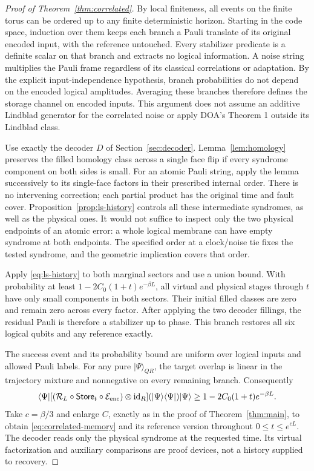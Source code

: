 \begin{proof}[Proof of Theorem~\ref{thm:correlated}]
By local finiteness, all events on the finite torus can
be ordered up to any finite deterministic horizon.
Starting in the code space, induction over them keeps
each branch a Pauli translate of its original encoded
input, with the reference untouched. Every stabilizer
predicate is a definite scalar on that branch and
extracts no logical information. A noise string
multiplies the Pauli frame regardless of its classical
correlations or adaptation. By the explicit
input-independence hypothesis, branch probabilities
do not depend on the encoded logical amplitudes.
Averaging these branches therefore defines the
storage channel on encoded inputs. This argument
does not assume an additive Lindblad generator
for the correlated noise or apply DOA's
Theorem 1 outside its Lindblad class.

Use exactly the decoder \(D\) of
Section~\ref{sec:decoder}. Lemma~\ref{lem:homology}
preserves the filled homology class across a single
face flip if every syndrome component on both
sides is small. For an atomic Pauli string,
apply the lemma successively to its single-face
factors in their prescribed internal order.
There is no intervening correction; each partial
product has the original time and fault cover.
Proposition~\ref{prop:ls-history} controls all these
intermediate syndromes, as well as the physical
ones. It would not suffice to inspect only the
two physical endpoints of an atomic error: a
whole logical membrane can have empty syndrome
at both endpoints. The specified order at a
clock/noise tie fixes the tested syndrome, and
the geometric implication covers that order.

Apply \eqref{eq:ls-history} to both marginal
sectors and use a union bound. With probability
at least \(1-2C_0(1+t)e^{-\beta L}\), all virtual
and physical stages through \(t\) have only small
components in both sectors. Their initial filled
classes are zero and remain zero across every
factor. After applying the two decoder fillings,
the residual Pauli is therefore a stabilizer up
to phase. This branch restores all six logical
qubits and any reference exactly.

The success event and its probability bound are
uniform over logical inputs and allowed Pauli
labels. For any pure \(|\Psi\rangle_{QR}\), the
target overlap is linear in the trajectory
mixture and nonnegative on every remaining
branch. Consequently
\[
 \langle\Psi|[(\mathcal R_L\circ\mathsf{Store}_t\circ\mathcal E_{\rm enc})
              \otimes\operatorname{id}_R](|\Psi\rangle\langle\Psi|)
                 |\Psi\rangle
 \ge1-2C_0(1+t)e^{-\beta L}.
\]
Take \(c=\beta/3\) and enlarge \(C\), exactly as
in the proof of Theorem~\ref{thm:main}, to obtain
\eqref{eq:correlated-memory} and its reference
version throughout \(0\le t\le e^{cL}\).
The decoder reads only the physical syndrome
at the requested time. Its virtual factorization
and auxiliary comparisons are proof devices,
not a history supplied to recovery.


\end{proof}

